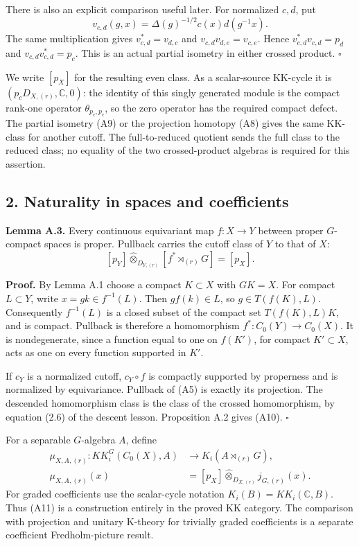 \documentclass[
  11pt,
]{article}
\begin{document}
There is also an explicit comparison useful later. For normalized
\(c,d\), put \[
v_{c,d}(g,x)=\Delta(g)^{-1/2}c(x)d(g^{-1}x).
\tag{A9}
\] The same multiplication gives \(v_{c,d}^*=v_{d,c}\) and
\(v_{c,d}v_{d,e}=v_{c,e}\). Hence \(v_{c,d}^*v_{c,d}=p_d\) and
\(v_{c,d}v_{c,d}^*=p_c\). This is an actual partial isometry in either
crossed product. \(\square\)

We write \([p_X]\) for the resulting even class. As a scalar-source
KK-cycle it is \((p_cD_{X,(r)},\mathbb C,0)\): the identity of this
singly generated module is the compact rank-one operator
\(\theta_{p_c,p_c}\), so the zero operator has the required compact
defect. The partial isometry (A9) or the projection homotopy (A8) gives
the same KK-class for another cutoff. The full-to-reduced quotient sends
the full class to the reduced class; no equality of the two
crossed-product algebras is required for this assertion.

\subsection{2. Naturality in spaces and
coefficients}\label{naturality-in-spaces-and-coefficients}

\textbf{Lemma A.3.} Every continuous equivariant map \(f:X\to Y\)
between proper \(G\)-compact spaces is proper. Pullback carries the
cutoff class of \(Y\) to that of \(X\): \[
[p_Y]\widehat\otimes_{D_{Y,(r)}}[f^*\rtimes_{(r)}G]=[p_X].
\tag{A10}
\]

\textbf{Proof.} By Lemma A.1 choose a compact \(K\subset X\) with
\(GK=X\). For compact \(L\subset Y\), write \(x=gk\in f^{-1}(L)\). Then
\(g f(k)\in L\), so \(g\in T(f(K),L)\). Consequently \(f^{-1}(L)\) is a
closed subset of the compact set \(T(f(K),L)K\), and is compact.
Pullback is therefore a homomorphism \(f^*:C_0(Y)\to C_0(X)\). It is
nondegenerate, since a function equal to one on \(f(K')\), for compact
\(K'\subset X\), acts as one on every function supported in \(K'\).

If \(c_Y\) is a normalized cutoff, \(c_Y\circ f\) is compactly supported
by properness and is normalized by equivariance. Pullback of (A5) is
exactly its projection. The descended homomorphism class is the class of
the crossed homomorphism, by equation (2.6) of the descent lesson.
Proposition A.2 gives (A10). \(\square\)

For a separable \(G\)-algebra \(A\), define \[
\begin{aligned}
\mu_{X,A,(r)}:KK_i^G(C_0(X),A)&\longrightarrow K_i(A\rtimes_{(r)}G),\\
\mu_{X,A,(r)}(x)&=[p_X]\widehat\otimes_{D_{X,(r)}}j_{G,(r)}(x).
\end{aligned}
\tag{A11}
\] For graded coefficients use the scalar-cycle notation
\(K_i(B)=KK_i(\mathbb C,B)\). Thus (A11) is a construction entirely in
the proved KK category. The comparison with projection and unitary
K-theory for trivially graded coefficients is a separate coefficient
Fredholm-picture result.
\end{document}
